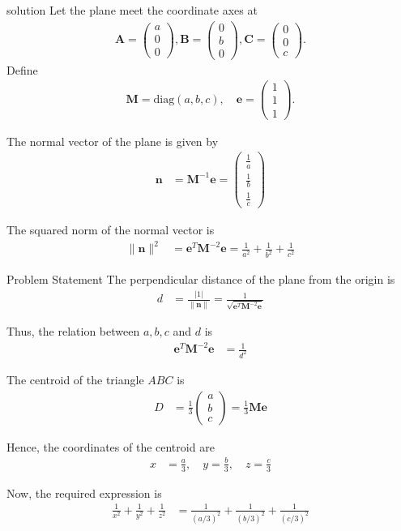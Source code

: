 \documentclass{beamer}
\numberwithin{equation}{section}
\theoremstyle{remark}
\newcommand{\myvec}[1]{\ensuremath{\begin{pmatrix}#1\end{pmatrix}}}
\let\vec\mathbf
\begin{document}
\begin{frame}{solution}
Let the plane meet the coordinate axes at 
\begin{align*}
\vec{A} = \myvec{a\\0\\0}, 
\vec{B} = \myvec{0\\b\\0}, 
\vec{C} = \myvec{0\\0\\c}.
\end{align*}
Define
\begin{align*}
    \vec{M} = \mathrm{diag}(a,b,c), 
\quad 
\vec{e} = \myvec{1 \\ 1 \\ 1}.
\end{align*}

The normal vector of the plane is given by
\begin{align}
\vec{n} &= \vec{M}^{-1} \vec{e} 
= \myvec{ \tfrac{1}{a} \\[6pt] \tfrac{1}{b} \\[6pt] \tfrac{1}{c} }
\end{align}

The squared norm of the normal vector is
\begin{align}
\|\vec{n}\|^2 &= \vec{e}^T \vec{M}^{-2} \vec{e} 
= \frac{1}{a^2} + \frac{1}{b^2} + \frac{1}{c^2}
\end{align}
\end{frame}
\begin{frame}{Problem Statement}
The perpendicular distance of the plane from the origin is
\begin{align}
d &= \frac{|1|}{\|\vec{n}\|} 
= \frac{1}{\sqrt{\vec{e}^T \vec{M}^{-2} \vec{e}}}
\end{align}

Thus, the relation between $a,b,c$ and $d$ is
\begin{align}
\vec{e}^T \vec{M}^{-2} \vec{e} &= \frac{1}{d^2}
\end{align}

The centroid of the triangle $ABC$ is
\begin{align}
D &= \frac{1}{3} \myvec{ a \\ b \\ c } 
= \frac{1}{3} \vec{M} \vec{e}
\end{align}

Hence, the coordinates of the centroid are
\begin{align}
x &= \tfrac{a}{3}, \quad y = \tfrac{b}{3}, \quad z = \tfrac{c}{3}
\end{align}

Now, the required expression is
\begin{align}
\frac{1}{x^2} + \frac{1}{y^2} + \frac{1}{z^2} 
&= \frac{1}{(a/3)^2} + \frac{1}{(b/3)^2} + \frac{1}{(c/3)^2}
\end{align}
\end{frame}
\end{document}
